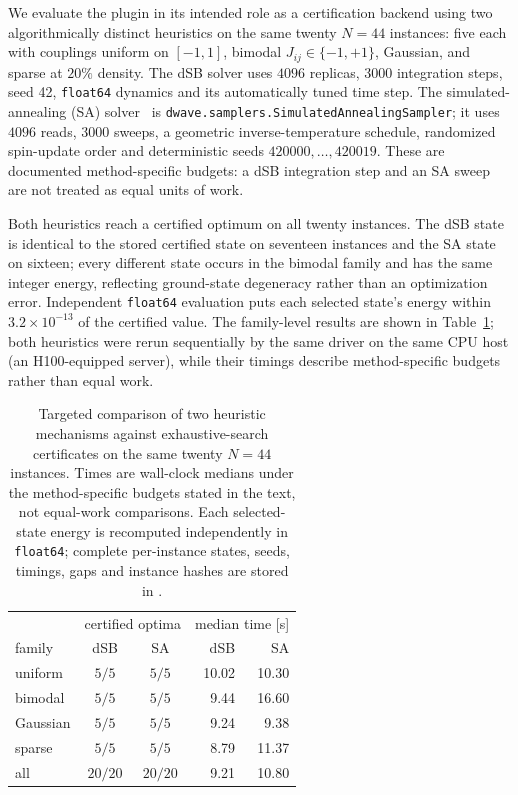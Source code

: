 \documentclass[12pt,a4paper]{elsarticle}
\begin{document}
We evaluate the plugin in its intended role as a certification backend using two
algorithmically distinct heuristics on the same twenty $N=44$ instances: five each with
couplings uniform on $[-1,1]$, bimodal $J_{ij}\in\{-1,+1\}$, Gaussian, and sparse at $20\%$
density. The dSB solver uses $4096$ replicas, $3000$ integration steps, seed 42,
\texttt{float64} dynamics and its automatically tuned time step. The simulated-annealing (SA)
solver~\cite{kirkpatrick1983optimization} is
\texttt{dwave.samplers.SimulatedAnnealingSampler}; it uses $4096$ reads, $3000$ sweeps, a
geometric inverse-temperature schedule, randomized spin-update order and deterministic seeds
$420000,\dots,420019$. These are documented method-specific budgets: a dSB integration step
and an SA sweep are not treated as equal units of work.

Both heuristics reach a certified optimum on all twenty instances. The dSB state is identical
to the stored certified state on seventeen instances and the SA state on sixteen; every
different state occurs in the bimodal family and has the same integer energy, reflecting
ground-state degeneracy rather than an optimization error. Independent \texttt{float64}
evaluation puts each selected state's energy within $3.2\times10^{-13}$ of the certified value.
The family-level results are shown in Table~\ref{tab:multisolver}; both heuristics were rerun
sequentially by the same driver on the same CPU host (an H100-equipped server),
while their timings describe method-specific budgets rather than equal work.

\begin{table}[H]
\centering
\small
\begin{tabular}{|l|cc|rr|}
\hline
 & \multicolumn{2}{c|}{certified optima} & \multicolumn{2}{c|}{median time [s]} \\
family & dSB & SA & dSB & SA \\
\hline
uniform  & $5/5$ & $5/5$ & 10.02 & 10.30 \\
bimodal  & $5/5$ & $5/5$ &  9.44 & 16.60 \\
Gaussian & $5/5$ & $5/5$ &  9.24 &  9.38 \\
sparse   & $5/5$ & $5/5$ &  8.79 & 11.37 \\
\hline
all      & $20/20$ & $20/20$ &  9.21 & 10.80 \\
\hline
\end{tabular}
\caption{Targeted comparison of two heuristic mechanisms against exhaustive-search
certificates on the same twenty $N=44$ instances. Times are wall-clock medians under the
method-specific budgets stated in the text, not equal-work comparisons. Each selected-state
energy is recomputed independently in \texttt{float64}; complete per-instance states,
seeds, timings, gaps and instance hashes are stored in
\protect{}.}
\label{tab:multisolver}
\end{table}
\end{document}
